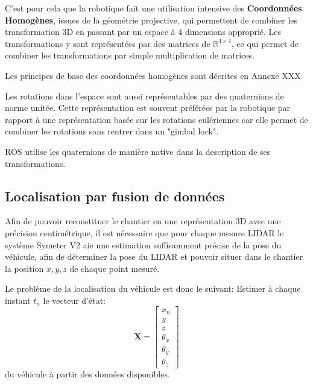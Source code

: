 \documentclass[12pt,a4paper]{report}
\begin{document}
		\para C'est pour cela que la robotique fait une utilisation intensive des \textbf{Coordonnées Homogènes}, issues de la géométrie projective, qui permettent de combiner les transformation 3D en passant par un espace à 4 dimensions approprié. Les transformations y sont représentées par des matrices de $\mathbb{R}^{4 \times 4}$, ce qui permet de combiner les transformations par simple multiplication de matrices.
		
		\para Les principes de base des coordonnées homogènes sont décrites en Annexe XXX 
		
		\para Les rotations dans l'espace sont aussi représentables par des quaternions de norme unitée. Cette représentation est souvent préférées par la robotique par rapport à une représentation basée sur les rotations eulériennes car elle permet de combiner les rotations sans rentrer dans un "gimbal lock". 
		
		\para ROS utilise les quaternions de manière native dans la description de ses transformations. 
		
			
		\subsection{Localisation par fusion de données}
		
		Afin de pouvoir reconstituer le chantier en une représentation 3D avec une précision centimétrique, il est nécessaire que pour chaque mesure LIDAR le système Symeter V2 aie une estimation suffisamment précise de la pose du véhicule, afin de déterminer la pose du LIDAR et pouvoir situer dans le chantier la position $x,y,z$ de chaque point mesuré.
		
		\para Le problème de la localisation du véhicule est donc le suivant:
		\para Estimer à chaque instant $t_n$ le vecteur d'état:
		\begin{equation}
		\mathbf{X} = \begin{bmatrix}
			x_n \\ y \\ z \\ \theta_x \\ \theta_y \\ \theta_z
		\end{bmatrix}
		\end{equation}
		du véhicule à partir des données disponibles.
		
		
\end{document}
